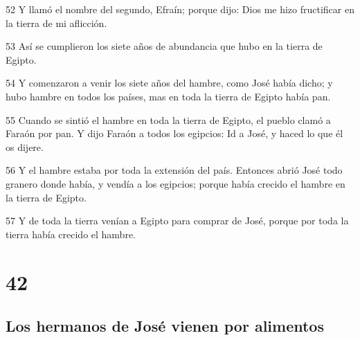 \par 52 Y llamó el nombre del segundo, Efraín; porque dijo: Dios me hizo fructificar en la tierra de mi aflicción.
\par 53 Así se cumplieron los siete años de abundancia que hubo en la tierra de Egipto.
\par 54 Y comenzaron a venir los siete años del hambre, como José había dicho; y hubo hambre en todos los países, mas en toda la tierra de Egipto había pan.
\par 55 Cuando se sintió el hambre en toda la tierra de Egipto, el pueblo clamó a Faraón por pan. Y dijo Faraón a todos los egipcios: Id a José, y haced lo que él os dijere.
\par 56 Y el hambre estaba por toda la extensión del país. Entonces abrió José todo granero donde había, y vendía a los egipcios; porque había crecido el hambre en la tierra de Egipto.
\par 57 Y de toda la tierra venían a Egipto para comprar de José, porque por toda la tierra había crecido el hambre.

\chapter{42}

\section*{Los hermanos de José vienen por alimentos}

